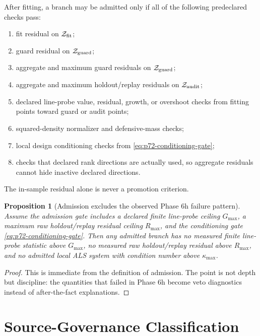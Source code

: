 \documentclass[11pt]{article}
\newtheorem{proposition}{Proposition}
\newcommand{\calZ}{\mathcal Z}
\begin{document}
After fitting, a branch may be admitted only if all of the following
predeclared checks pass:
\begin{enumerate}[leftmargin=2em]
    \item fit residual on \(\calZ_{\rm fit}\);
    \item guard residual on \(\calZ_{\rm guard}\);
    \item aggregate and maximum guard residuals on \(\calZ_{\rm guard}\);
    \item aggregate and maximum holdout/replay residuals on \(\calZ_{\rm audit}\);
    \item declared line-probe value, residual, growth, or overshoot checks from
    fitting points toward guard or audit points;
    \item squared-density normalizer and defensive-mass checks;
    \item local design conditioning checks from \eqref{eq:p72-conditioning-gate};
    \item checks that declared rank directions are actually used, so aggregate
    residuals cannot hide inactive declared directions.
\end{enumerate}
The in-sample residual alone is never a promotion criterion.

\begin{proposition}[Admission excludes the observed Phase 6h failure pattern]
\label{prop:p72-admission-excludes-phase6h}
Assume the admission gate includes a declared finite line-probe ceiling
\(G_{\max}\), a maximum raw holdout/replay residual ceiling \(R_{\max}\), and
the conditioning gate \eqref{eq:p72-conditioning-gate}.  Then any admitted
branch has no measured finite line-probe statistic above \(G_{\max}\), no
measured raw holdout/replay residual above \(R_{\max}\), and no admitted local
ALS system with condition number above \(\kappa_{\max}\).
\end{proposition}

\begin{proof}
This is immediate from the definition of admission.  The point is not depth
but discipline: the quantities that failed in Phase 6h become veto diagnostics
instead of after-the-fact explanations.
\end{proof}

\section{Source-Governance Classification}
\end{document}
